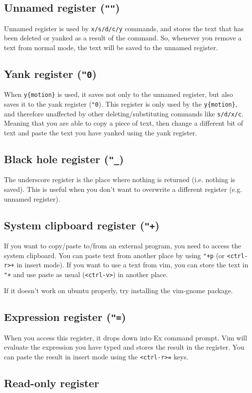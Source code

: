 \subsection{Unnamed register (\texttt{""})}

Unnamed register is used by \verb|x/s/d/c/y| commands, and stores the text that has been deleted or yanked as a result of the command.
So, whenever you remove a text from normal mode, the text will be saved to the unnamed register.

\subsection{Yank register (\texttt{"0})}

When \verb|y{motion}| is used, it saves not only to the unnamed register, but also saves it to the yank register (\verb|"0|).
This register is only used by the \verb|y{motion}|, and therefore unaffected by other deleting/substituting commands like \verb|s/d/x/c|.
Meaning that you are able to copy a piece of text, then change a different bit of text and paste the text you have yanked using the yank register.

\subsection{Black hole register (\texttt{"\_})}

The underscore register is the place where nothing is returned (i.e. nothing is saved).
This is useful when you don't want to overwrite a different register (e.g. unnamed register).

\subsection{System clipboard register (\texttt{"+})}

If you want to copy/paste to/from an external program, you need to access the system clipboard.
You can paste text from another place by using \verb|"+p| (or \verb|<ctrl-r>+| in insert mode).
If you want to use a text from vim, you can store the text in \verb|"+| and use paste as usual (\verb|<ctrl-v>|) in another place.

If it doesn't work on ubuntu properly, try installing the vim-gnome package.

\subsection{Expression register (\texttt{"=})}

When you access this register, it drops down into Ex command prompt.
Vim will evaluate the expression you have typed and stores the result in the register.
You can paste the result in insert mode using the \verb|<ctrl-r>=| keys.

\subsection{Read-only register}



